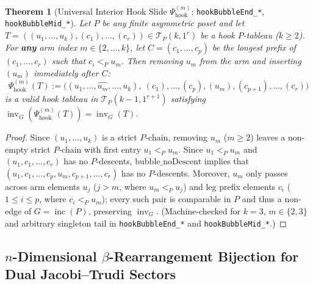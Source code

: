 \documentclass[11pt]{article}
\newtheorem{theorem}{Theorem}[section]
\theoremstyle{definition}
\newcommand{\invG}{\operatorname{inv}_G}
\newcommand{\inc}{\operatorname{inc}}
\newcommand{\TP}{\mathcal{T}_P}
\begin{document}
\begin{theorem}[Universal Interior Hook Slide $\Psi_{\mathrm{hook}}^{(m)}$; \texttt{hookBubbleEnd\_*}, \texttt{hookBubbleMid\_*}]
\label{thm:hook-slide}
Let $P$ be any finite asymmetric poset and let $T = ((u_1, \dots, u_k), (c_1), \dots, (c_r)) \in \TP(k, 1^r)$ be a hook $P$-tableau ($k \ge 2$). For \textbf{any} arm index $m \in \{2, \dots, k\}$, let $C = (c_1, \dots, c_p)$ be the longest prefix of $(c_1, \dots, c_r)$ such that $c_i <_P u_m$. Then removing $u_m$ from the arm and inserting $(u_m)$ immediately after $C$:
\[
  \Psi_{\mathrm{hook}}^{(m)}(T) := \big((u_1, \dots, \widehat{u_m}, \dots, u_k),\ (c_1), \dots, (c_p), (u_m), (c_{p+1}), \dots, (c_r)\big)
\]
is a valid hook tableau in $\TP(k-1, 1^{r+1})$ satisfying $\invG(\Psi_{\mathrm{hook}}^{(m)}(T)) = \invG(T)$.
\end{theorem}
\begin{proof}
Since $(u_1, \dots, u_k)$ is a strict $P$-chain, removing $u_m$ ($m \ge 2$) leaves a non-empty strict $P$-chain with first entry $u_1 <_P u_m$. Since $u_1 <_P u_m$ and $(u_1, c_1, \dots, c_r)$ has no $P$-descents, $\mathrm{bubble\_noDescent}$ implies that $(u_1, c_1, \dots, c_p, u_m, c_{p+1}, \dots, c_r)$ has no $P$-descents. Moreover, $u_m$ only passes across arm elements $u_j$ ($j > m$, where $u_m <_P u_j$) and leg prefix elements $c_i$ ($1 \le i \le p$, where $c_i <_P u_m$); every such pair is comparable in $P$ and thus a non-edge of $G = \inc(P)$, preserving $\invG$. (Machine-checked for $k=3$, $m \in \{2, 3\}$ and arbitrary singleton tail in \texttt{hookBubbleEnd\_*} and \texttt{hookBubbleMid\_*}.)
\end{proof}

\subsection{$n$-Dimensional $\beta$-Rearrangement Bijection for Dual Jacobi--Trudi Sectors}
\end{document}
